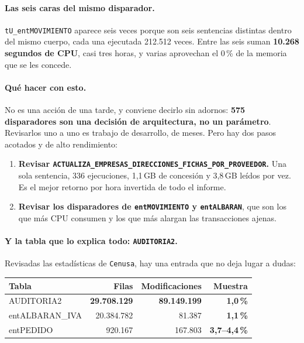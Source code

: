 \documentclass[11pt,a4paper]{article}
\newcommand{\cod}[1]{\texttt{\small #1}}
\newcommand{\critico}[1]{\textcolor{rojo}{\textbf{#1}}}
\newcommand{\aviso}[1]{\textcolor{ambar}{\textbf{#1}}}
\begin{document}
\paragraph{Las seis caras del mismo disparador.}
\cod{tU\_entMOVIMIENTO} aparece seis veces porque son seis sentencias
distintas dentro del mismo cuerpo, cada una ejecutada 212.512 veces. Entre
las seis suman \textbf{10.268 segundos de CPU}, casi tres horas, y varias
aprovechan el 0\,\% de la memoria que se les concede.

\paragraph{Qué hacer con esto.} No es una acción de una tarde, y conviene
decirlo sin adornos: \textbf{575 disparadores son una decisión de
arquitectura, no un parámetro}. Revisarlos uno a uno es trabajo de
desarrollo, de meses. Pero hay dos pasos acotados y de alto rendimiento:

\begin{enumerate}\itemsep2pt
  \item \textbf{Revisar
        \cod{ACTUALIZA\_EMPRESAS\_DIRECCIONES\_FICHAS\_POR\_PROVEEDOR}.} Una
        sola sentencia, 336 ejecuciones, 1,1\,GB de concesión y 3,8\,GB
        leídos por vez. Es el mejor retorno por hora invertida de todo el
        informe.
  \item \textbf{Revisar los disparadores de \cod{entMOVIMIENTO} y
        \cod{entALBARAN}}, que son los que más CPU consumen y los que más
        alargan las transacciones ajenas.
\end{enumerate}

\paragraph{Y la tabla que lo explica todo: \cod{AUDITORIA2}.} Revisadas las
estadísticas de \cod{Cenusa}, hay una entrada que no deja lugar a dudas:

\begin{table}[h]
\centering
\small
\begin{tabular}{lrrr}
\toprule
\textbf{Tabla} & \textbf{Filas} & \textbf{Modificaciones} & \textbf{Muestra} \\
\midrule
AUDITORIA2       & \critico{29.708.129} & \critico{89.149.199} & \critico{1,0\,\%} \\
entALBARAN\_IVA  & 20.384.782 &  81.387 & \critico{1,1\,\%} \\
entPEDIDO        &    920.167 & 167.803 & \aviso{3,7--4,4\,\%} \\
\bottomrule
\end{tabular}
\end{table}
\end{document}
